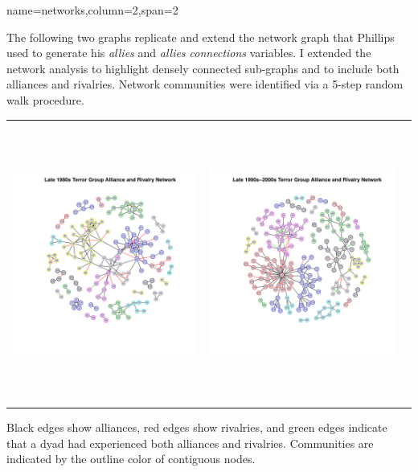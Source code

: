 \documentclass[landscape,paperheight=24in,fontscale=.45,paperwidth=36in,landscape,final]{baposter}
\begin{document}
\begin{poster}
{name=networks,column=2,span=2}
{
The following two graphs replicate and extend the network graph that Phillips
used to generate his \textit{allies} and \textit{allies connections}
variables. I extended the network analysis to highlight densely
connected sub-graphs and to include both alliances and
rivalries. Network communities were
identified via a 5-step random walk procedure.
\vspace{-05mm}
\begin{center}
\begin{tabular}{ccc}
\includegraphics[height=92mm,width=81mm]{Poster_Final_80sNetwork.pdf}
  & \includegraphics[height=92mm,width=81mm]{Paper_Graph_Nineties.pdf}\\
\end{tabular}
\end{center}
\vspace{-15mm}
Black edges show alliances, red edges show rivalries, and green edges
indicate that a dyad had experienced both alliances and rivalries.
Communities are indicated by the outline color of contiguous nodes.
}


\end{poster}
\end{document}
